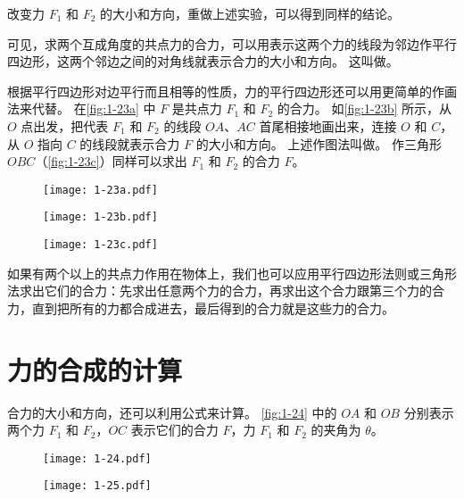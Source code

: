 改变力 $F_1$ 和 $F_2$ 的大小和方向，重做上述实验，可以得到同样的结论。

可见，求两个互成角度的共点力的合力，可以用表示这两个力的线段为邻边作平行四边形，这两个邻边之间的对角线就表示合力的大小和方向。
这叫做。

根据平行四边形对边平行而且相等的性质，力的平行四边形还可以用更简单的作画法来代替。
在\cref{fig:1-23a} 中 $F$ 是共点力 $F_1$ 和 $F_2$ 的合力。
如\cref{fig:1-23b} 所示，从 $O$ 点出发，把代表 $F_1$ 和 $F_2$ 的线段 $OA$、$AC$ 首尾相接地画出来，连接 $O$ 和 $C$，从 $O$ 指向 $C$ 的线段就表示合力 $F$ 的大小和方向。
上述作图法叫做。
作三角形 $OBC$（\cref{fig:1-23c}）同样可以求出 $F_1$ 和 $F_2$ 的合力 $F$。

\begin{figure}
  \begin{minipage}{0.3\linewidth}\centering
    \texttt{[image: 1-23a.pdf]}
    \subcaption{}\label{fig:1-23a}
  \end{minipage}
  \begin{minipage}{0.3\linewidth}\centering
    \texttt{[image: 1-23b.pdf]}
    \subcaption{}\label{fig:1-23b}
  \end{minipage}
  \begin{minipage}{0.3\linewidth}\centering
    \texttt{[image: 1-23c.pdf]}
    \subcaption{}\label{fig:1-23c}
  \end{minipage}
  \caption{}\label{fig:1-23}
\end{figure}

如果有两个以上的共点力作用在物体上，我们也可以应用平行四边形法则或三角形法求出它们的合力：先求出任意两个力的合力，再求出这个合力跟第三个力的合力，直到把所有的力都合成进去，最后得到的合力就是这些力的合力。

\section{力的合成的计算}
合力的大小和方向，还可以利用公式来计算。
\cref{fig:1-24} 中的 $OA$ 和 $OB$ 分别表示两个力 $F_1$ 和 $F_2$，$OC$ 表示它们的合力 $F$，力 $F_1$ 和 $F_2$ 的夹角为 $\theta$。

\begin{figure}
  \begin{minipage}[b]{0.42\linewidth}\centering
    \texttt{[image: 1-24.pdf]}
    \caption{}\label{fig:1-24}
  \end{minipage}
  \begin{minipage}[b]{0.55\linewidth}\centering
    \texttt{[image: 1-25.pdf]}
    \caption{}\label{fig:1-25}
  \end{minipage}
\end{figure}

